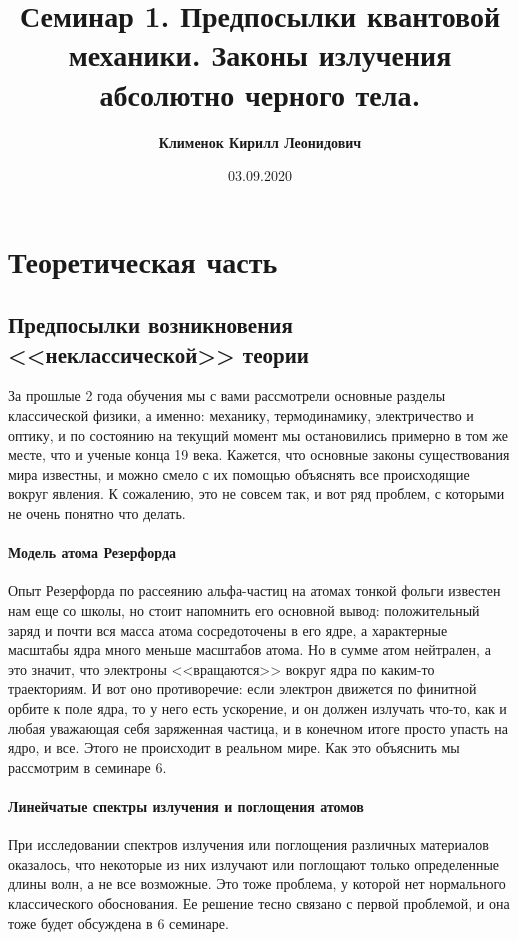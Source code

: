 \documentclass[12pt]{article}
\begin{document}
 
\title{\textbf{Семинар 1. Предпосылки квантовой механики. Законы излучения абсолютно черного тела.}}
\author{\textbf{Клименок Кирилл Леонидович}}
\date{03.09.2020}
\maketitle

\section{Теоретическая часть}

\subsection{Предпосылки возникновения <<неклассической>> теории}
За прошлые 2 года обучения мы с вами рассмотрели основные разделы классической физики, а именно: механику, термодинамику, электричество и оптику, и по состоянию на текущий момент мы остановились примерно в том же месте, что и ученые конца 19 века. Кажется, что основные законы существования мира известны, и можно смело с их помощью объяснять все происходящие вокруг явления. К сожалению, это не совсем так, и вот ряд проблем, с которыми не очень понятно что делать.

\paragraph{Модель атома Резерфорда}
Опыт Резерфорда по рассеянию альфа-частиц на атомах тонкой фольги известен нам еще со школы, но стоит напомнить его основной вывод: положительный заряд и почти вся масса атома сосредоточены в его ядре, а характерные масштабы ядра много меньше масштабов атома. Но в сумме атом нейтрален, а это значит, что электроны <<вращаются>> вокруг ядра по каким-то траекториям. И вот оно противоречие: если электрон движется по финитной орбите к поле ядра, то у него есть ускорение, и он должен излучать что-то, как и любая уважающая себя заряженная частица, и в конечном итоге просто упасть на ядро, и все. Этого не происходит в реальном мире. Как это объяснить мы рассмотрим в семинаре 6.

\paragraph{Линейчатые спектры излучения и поглощения атомов} 
При исследовании спектров излучения или поглощения различных материалов оказалось, что некоторые из них излучают или поглощают только определенные длины волн, а не все возможные. Это тоже проблема, у которой нет нормального классического обоснования. Ее решение тесно связано с первой проблемой, и она тоже будет обсуждена в 6 семинаре.
\end{document}
